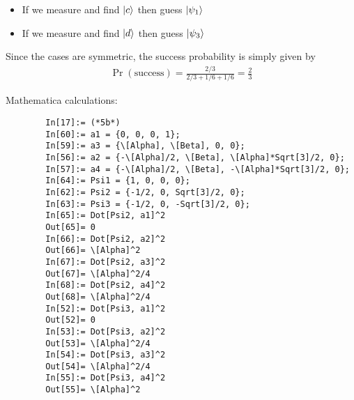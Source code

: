 \documentclass{article}
\theoremstyle{definition}
\newcommand{\f}[2]{\frac{#1}{#2}}
\begin{document}
\begin{enumerate}[label=(\alph*)]
\begin{itemize}
		\item If we measure and find $\ket{c}$ then guess $\ket{\psi_1}$ 
		
		\item If we measure and find $\ket{d}$ then guess $\ket{\psi_3}$
	\end{itemize}

	Since the cases are symmetric, the success probability is simply given by 
	\begin{align*}
		\Pr(\text{success}) = \f{2/3}{2/3+1/6+1/6} = \f{2}{3}
	\end{align*}

	Mathematica calculations:
	\begin{lstlisting}
		In[17]:= (*5b*)
		In[60]:= a1 = {0, 0, 0, 1};
		In[59]:= a3 = {\[Alpha], \[Beta], 0, 0};
		In[56]:= a2 = {-\[Alpha]/2, \[Beta], \[Alpha]*Sqrt[3]/2, 0};
		In[57]:= a4 = {-\[Alpha]/2, \[Beta], -\[Alpha]*Sqrt[3]/2, 0};
		In[64]:= Psi1 = {1, 0, 0, 0};
		In[62]:= Psi2 = {-1/2, 0, Sqrt[3]/2, 0};
		In[63]:= Psi3 = {-1/2, 0, -Sqrt[3]/2, 0};
		In[65]:= Dot[Psi2, a1]^2
		Out[65]= 0
		In[66]:= Dot[Psi2, a2]^2
		Out[66]= \[Alpha]^2		
		In[67]:= Dot[Psi2, a3]^2		
		Out[67]= \[Alpha]^2/4		
		In[68]:= Dot[Psi2, a4]^2		
		Out[68]= \[Alpha]^2/4		
		In[52]:= Dot[Psi3, a1]^2		
		Out[52]= 0		
		In[53]:= Dot[Psi3, a2]^2		
		Out[53]= \[Alpha]^2/4		
		In[54]:= Dot[Psi3, a3]^2		
		Out[54]= \[Alpha]^2/4		
		In[55]:= Dot[Psi3, a4]^2	
		Out[55]= \[Alpha]^2
	\end{lstlisting}


\end{enumerate}
\end{document}

